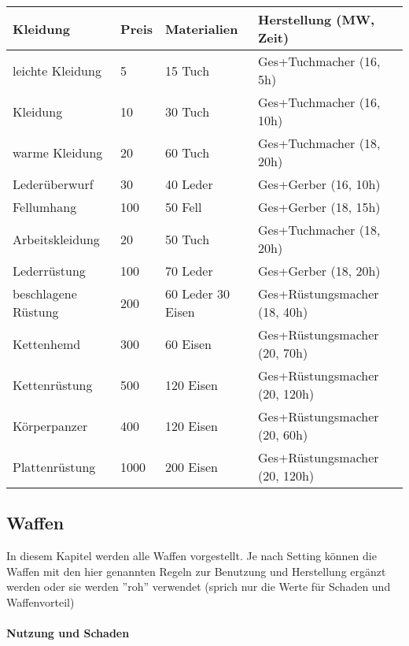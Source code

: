 \documentclass{article}
\begin{document}
\begin{small}
\begin{tabular}{|m{25mm}|m{1cm}|m{3cm}|m{5cm}|}
\hline
\textbf{Kleidung}&\textbf{Preis}&\textbf{Materialien}&\textbf{Herstellung (MW, Zeit)}\\
\hline
\hline
leichte Kleidung&5&15 Tuch&Ges+Tuchmacher (16, 5h)\\
\hline
Kleidung&10&30 Tuch&Ges+Tuchmacher (16, 10h)\\
\hline
warme Kleidung&20&60 Tuch&Ges+Tuchmacher (18, 20h)\\
\hline
Lederüberwurf&30&40 Leder&Ges+Gerber (16, 10h)\\
\hline
Fellumhang&100&50 Fell&Ges+Gerber (18, 15h)\\
\hline
Arbeitskleidung&20&50 Tuch&Ges+Tuchmacher (18, 20h)\\
\hline
Lederrüstung&100&70 Leder&Ges+Gerber (18, 20h)\\
\hline
beschlagene Rüstung&200&60 Leder 30 Eisen&Ges+Rüstungsmacher (18, 40h)\\
\hline
Kettenhemd&300&60 Eisen&Ges+Rüstungsmacher (20, 70h)\\
\hline
Kettenrüstung&500&120 Eisen&Ges+Rüstungsmacher (20, 120h)\\
\hline
Körperpanzer&400&120 Eisen&Ges+Rüstungsmacher (20, 60h)\\
\hline
Plattenrüstung&1000&200 Eisen&Ges+Rüstungsmacher (20, 120h)\\
\hline
\end{tabular}
\end{small}

\begin{center}
\subsection{Waffen}
\end{center}

In diesem Kapitel werden alle Waffen vorgestellt. Je nach Setting können die Waffen mit den hier genannten Regeln
zur Benutzung und Herstellung ergänzt werden oder sie werden ''roh'' verwendet (sprich nur die Werte für Schaden und
Waffenvorteil)

\paragraph{Nutzung und Schaden}
\end{document}
